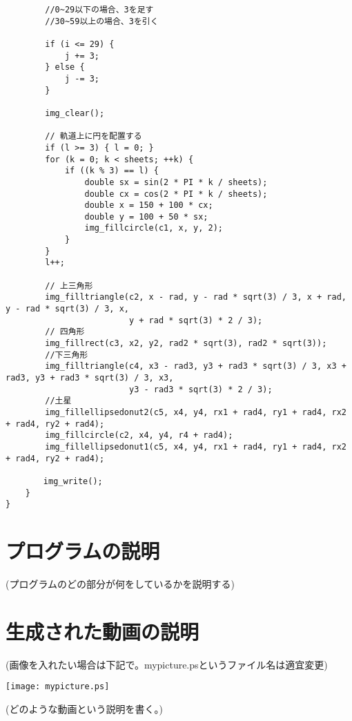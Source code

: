 \documentclass[12pt,a4j]{jarticle}
\begin{document}
\begin{verbatim}
        //0~29以下の場合、3を足す
        //30~59以上の場合、3を引く

        if (i <= 29) {
            j += 3;
        } else {
            j -= 3;
        }

        img_clear();

        // 軌道上に円を配置する
        if (l >= 3) { l = 0; }
        for (k = 0; k < sheets; ++k) {
            if ((k % 3) == l) {
                double sx = sin(2 * PI * k / sheets);
                double cx = cos(2 * PI * k / sheets);
                double x = 150 + 100 * cx;
                double y = 100 + 50 * sx;
                img_fillcircle(c1, x, y, 2);
            }
        }
        l++;

        // 上三角形
        img_filltriangle(c2, x - rad, y - rad * sqrt(3) / 3, x + rad, y - rad * sqrt(3) / 3, x,
                         y + rad * sqrt(3) * 2 / 3);
        // 四角形
        img_fillrect(c3, x2, y2, rad2 * sqrt(3), rad2 * sqrt(3));
        //下三角形
        img_filltriangle(c4, x3 - rad3, y3 + rad3 * sqrt(3) / 3, x3 + rad3, y3 + rad3 * sqrt(3) / 3, x3,
                         y3 - rad3 * sqrt(3) * 2 / 3);
        //土星
        img_fillellipsedonut2(c5, x4, y4, rx1 + rad4, ry1 + rad4, rx2 + rad4, ry2 + rad4);
        img_fillcircle(c2, x4, y4, r4 + rad4);
        img_fillellipsedonut1(c5, x4, y4, rx1 + rad4, ry1 + rad4, rx2 + rad4, ry2 + rad4);

      　img_write();
    }
}

\end{verbatim}

\section{プログラムの説明}

(プログラムのどの部分が何をしているかを説明する)

\section{生成された動画の説明}

(画像を入れたい場合は下記で。mypicture.psというファイル名は適宜変更)

\begin{center}

\texttt{[image: mypicture.ps]}

\end{center}

(どのような動画という説明を書く。)
\end{document}
